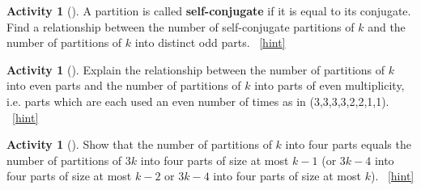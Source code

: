 \documentclass[10pt,]{book}
\newcommand{\terminology}[1]{\textbf{#1}}
\theoremstyle{plain}
\theoremstyle{definition}
\theoremstyle{definition}
\theoremstyle{definition}
\newtheorem{activity}[project]{Activity}
\numberwithin{equation}{chapter}
\begin{document}
\begin{activity}[]\label{activity-298}
\hypertarget{p-1509}{}%
A partition is called \terminology{self-conjugate} if it is equal to its conjugate. Find a relationship between the number of self-conjugate partitions of \(k\) and the number of partitions of \(k\) into distinct odd parts.%
~\hfill{\tiny\hyperlink{a-305}{[hint]}\hypertarget{q-305}{}}\end{activity}
\begin{activity}[]\label{partition-even-mult-even-use}
\hypertarget{p-1513}{}%
Explain the relationship between the number of partitions of \(k\) into even parts and the number of partitions of \(k\) into parts of even multiplicity, i.e. parts which are each used an even number of times as in (3,3,3,3,2,2,1,1).%
~\hfill{\tiny\hyperlink{a-306}{[hint]}\hypertarget{q-306}{}}\end{activity}
\begin{activity}[]\label{rectanglecomplement}
\hypertarget{p-1516}{}%
Show that the number of partitions of \(k\) into four parts equals the number of partitions of \(3k\) into four parts of size at most \(k-1\) (or \(3k-4\) into four parts of size at most \(k-2\) or \(3k-4\) into four parts of size at most \(k\)).%
~\hfill{\tiny\hyperlink{a-307}{[hint]}\hypertarget{q-307}{}}\end{activity}
\end{document}
